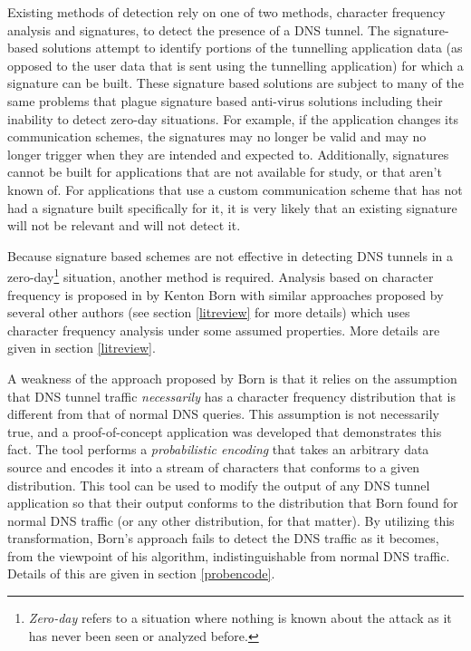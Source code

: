 \documentclass[12pt]{report}
\theoremstyle{remark}
\theoremstyle{definition}
\theoremstyle{definition}
\theoremstyle{definition}
\begin{document}
Existing methods of detection rely on one of two methods, character frequency
analysis
and signatures, to detect the presence of a DNS tunnel. The signature-based
solutions attempt to identify portions of the tunnelling
application data (as opposed to the user data that is sent using the tunnelling
application) for which a signature can be built. These signature based
solutions are subject to many of the same problems that plague signature based
anti-virus solutions including their inability to detect zero-day situations.
 For example, if the application changes its communication
schemes, the signatures may no longer be valid and may no longer trigger when
they are intended and expected to. Additionally, signatures cannot be built for
applications
that are not available for study, or that aren't known of. For applications
that use a custom communication scheme that has not had a signature built
specifically for it, it is very likely that an existing signature will not be
relevant and will not detect it.

Because signature based schemes are not effective in detecting DNS tunnels in a
zero-day\footnote{\emph{Zero-day} refers to a situation where nothing is
known about the attack as it has never been seen or analyzed before.} situation,
another
method is required. Analysis based on character frequency is proposed
in\cite{Born2010.cfa} by Kenton Born with similar approaches proposed by several
other authors (see section \ref{litreview} for more details) which uses
character
frequency analysis under some assumed properties. More details are given in section
\ref{litreview}.


A weakness of the approach proposed by Born is that it relies on the assumption
that DNS tunnel traffic \emph{necessarily} has a character frequency
distribution that is different from that of normal DNS queries. This assumption
is not necessarily true, and a proof-of-concept application
was developed that demonstrates this fact. The tool performs a
\emph{probabilistic encoding} that takes an arbitrary data source and encodes
it into a stream of characters that conforms to a given distribution. This tool
can be used to modify the output of any DNS tunnel application so that their
output conforms to the distribution that Born found for normal DNS traffic (or
any other distribution, for that matter). By
utilizing this transformation, Born's approach fails to detect the DNS traffic
as it becomes, from the viewpoint of his algorithm, indistinguishable from
normal DNS traffic. Details of this are given in section \ref{probencode}.
\end{document}
